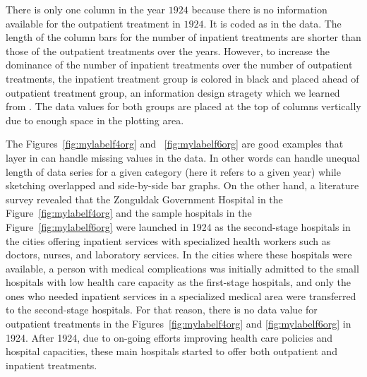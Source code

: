 There is only one column in the year $1924$ because there is no information available for the outpatient treatment in $1924$. It is coded as  in the data.  The length of the column bars for the number of inpatient treatments are shorter than those of the outpatient treatments over the years. However, to increase the dominance of the number of inpatient treatments over the number of outpatient treatments, the inpatient treatment group is colored in black and placed ahead of outpatient treatment group, an information design stragety which we learned from \cite {White}. The data values for both groups are placed at the top of columns vertically due to enough space in the plotting area. 

The Figures~\ref{fig:mylabelf4org} and ~\ref{fig:mylabelf6org}
are good examples  that  layer in  can handle missing values in the data. In other words can handle unequal length of data series for a given category (here it refers to a given year) while sketching  overlapped and side-by-side bar graphs. On the other hand, a literature survey revealed that the Zonguldak Government Hospital in the Figure~\ref{fig:mylabelf4org} and the sample hospitals in the Figure~\ref{fig:mylabelf6org} were launched in 1924 as the second-stage hospitals in the cities offering inpatient services with specialized health workers such as doctors, nurses,  and laboratory services. In the cities where these hospitals were available, a person with medical complications  was initially admitted to the small hospitals with low health care capacity as the first-stage hospitals, and only the ones who needed inpatient services in a specialized medical area were transferred to the second-stage hospitals. For that reason, there is no data value for outpatient treatments in the Figures~\ref{fig:mylabelf4org} and \ref{fig:mylabelf6org} in 1924. After 1924, due to on-going efforts improving health care policies and hospital capacities, these main hospitals started to offer both outpatient and inpatient treatments.


